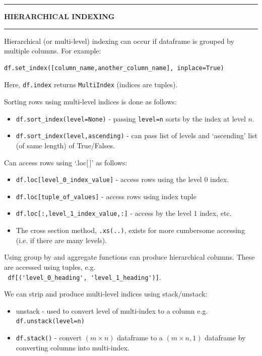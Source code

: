 \documentclass[8pt]{extarticle}
\newcommand{\heading}[1]{%
    \noindent
    \rule{\linewidth}{0.4pt}
    \begin{center}
        \vspace{-1ex}
        \textbf{#1}        
        \vspace{-2.5ex}
    \end{center}
    \rule{\linewidth}{0.4pt}
}
\begin{document}
\begin{multicols}{4}
\setlength{\columnseprule}{1pt} %

\heading{HIERARCHICAL INDEXING}

Hierarchical (or multi-level) indexing can occur if dataframe is grouped by multiple columns. For example:
\begin{lstlisting}[style=Python]
df.set_index([column_name,another_column_name], inplace=True)
\end{lstlisting}
Here, \lstinline[style=Python]!df.index! returns \lstinline[style=Python]!MultiIndex! (indices are tuples).

Sorting rows using multi-level indices is done as follows:
\begin{itemize}
    \item \lstinline[style=Python]!df.sort_index(level=None)! - passing \lstinline[style=Python]!level=n! sorts by the index at level $n$.
    \item \lstinline[style=Python]!df.sort_index(level,ascending)! - can pass list of levels and `ascending' list (of same length) of True/Falses.
\end{itemize}

Can access rows using `.loc[$\,$]' as follows:
\begin{itemize}
    \item \lstinline[style=Python]!df.loc[level_0_index_value]! - access rows using the level $0$ index.
    \item \lstinline[style=Python]!df.loc[tuple_of_values]! - access rows using index tuple 
    \item \lstinline[style=Python]!df.loc[:,level_1_index_value,:]! - access by the level $1$ index, etc.
    \item The cross section method, \lstinline[style=Python]!.xs(..)!, exists for more cumbersome accessing (i.e. if there are many levels).
\end{itemize}

\begin{tcolorbox}[width=\columnwidth, colback=white!95!black]
Using group by and aggregate functions can produce hierarchical columns. These are accessed using tuples, e.g. \\
\lstinline[style=Python]! df[('level_0_heading', 'level_1_heading')]!.
\end{tcolorbox}

We can strip and produce multi-level indices using stack/unstack:
\begin{itemize}
    \item unstack - used to convert level of multi-index to a column e.g. \lstinline[style=Python]!df.unstack(level=n)!
    \item \lstinline[style=Python]!df.stack()! - convert $(m \times n)$ dataframe to a $(m \times n,1)$ dataframe by converting columns into multi-index.
\end{itemize}



\end{multicols}
\end{document}
